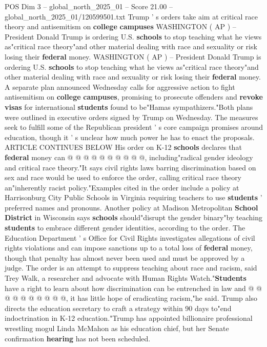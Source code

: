 \begin{textsample}{POS Dim 3 – global\_north\_2025\_01 – Score 21.00 – global\_north\_2025\_01/120599501.txt}  \label{ex:f3_pos_260}
Trump ' s orders take aim at critical race theory and antisemitism on \textbf{college} \textbf{campuses} WASHINGTON ( AP ) -- President Donald Trump is ordering U.S. \textbf{schools} to stop teaching what he views as"critical race theory"and other material dealing with race and sexuality or risk losing their \textbf{federal} money.
WASHINGTON ( AP ) -- President Donald Trump is ordering U.S. \textbf{schools} to stop teaching what he views as"critical race theory"and other material dealing with race and sexuality or risk losing their \textbf{federal} money.
A separate plan announced Wednesday calls for aggressive action to fight antisemitism on \textbf{college} \textbf{campuses}, promising to prosecute offenders and \textbf{revoke} \textbf{visas} for international \textbf{students} found to be"Hamas sympathizers."Both plans were outlined in executive orders signed by Trump on Wednesday.
The measures seek to fulfill some of the Republican president ' s core campaign promises around education, though it ' s unclear how much power he has to enact the proposals.
ARTICLE CONTINUES BELOW His order on K-12 \textbf{schools} declares that \textbf{federal} money can @ @ @ @ @ @ @ @ @ @, including"radical gender ideology and critical race theory."It says civil rights laws barring discrimination based on sex and race would be used to enforce the order, calling critical race theory an"inherently racist policy."Examples cited in the order include a policy at Harrisonburg City Public Schools in Virginia requiring teachers to use \textbf{students} ' preferred names and pronouns.
Another policy at Madison Metropolitan \textbf{School} \textbf{District} in Wisconsin says \textbf{schools} should"disrupt the gender binary"by teaching \textbf{students} to embrace different gender identities, according to the order.
The Education Department ' s Office for Civil Rights investigates allegations of civil rights violations and can impose sanctions up to a total loss of \textbf{federal} money, though that penalty has almost never been used and must be approved by a judge.
The order is an attempt to suppress teaching about race and racism, said Trey Walk, a researcher and advocate with Human Rights Watch."\textbf{Students} have a right to learn about how discrimination can be entrenched in law and @ @ @ @ @ @ @ @ @ @, it has little hope of eradicating racism,"he said.
Trump also directs the education secretary to craft a strategy within 90 days to"end indoctrination in K-12 education."Trump has appointed billionaire professional wrestling mogul Linda McMahon as his education chief, but her Senate confirmation \textbf{hearing} has not been scheduled.

\end{textsample}
